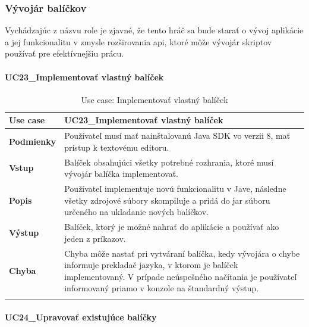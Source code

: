 {\subsubsection{Vývojár balíčkov}
\indent Vychádzajúc z názvu role je zjavné, že tento hráč sa bude starať o vývoj aplikácie a jej funkcionalitu v zmysle rozširovania \acrshort{api}, ktoré môže vývojár skriptov používať pre efektívnejšiu prácu.
\paragraph{UC23\_Implementovať vlastný balíček}
\begin{center}
	\begin{longtable}{|p{2.5cm}|p{12.2cm}|}
		
			\hline
			\textbf{Use case} & UC23\_Implementovať vlastný balíček \\ 
			\hline
			\textbf{Podmienky} & Používateľ musí mať nainštalovanú Java SDK vo verzii 8, mať prístup k textovému editoru.  \\ 
			\hline
			\textbf{Vstup} & Balíček obsahujúci všetky potrebné rozhrania, ktoré musí vývojár balíčka implementovať.\\
			\hline
			\textbf{Popis} & Používateľ implementuje novú funkcionalitu v Jave, následne všetky zdrojové súbory skompiluje a pridá do \acrshort{jar} súboru určeného na ukladanie nových balíčkov.\\ 
			\hline
			\textbf{Výstup} & Balíček, ktorý je možné nahrať do aplikácie a používať ako jeden z príkazov.\\
			\hline
			\textbf{Chyba} & Chyba môže nastať pri vytváraní balíčka, kedy vývojára o chybe informuje prekladač jazyka, v ktorom je balíček implementovaný. V prípade neúspešného načítania je používateľ informovaný priamo v konzole na štandardný výstup.\\
			\hline
		\caption{Use case: Implementovať vlastný balíček}
		\label{table:1}
		
	\end{longtable}
\end{center}

\paragraph{UC24\_Upravovať existujúce balíčky}
\begin{center}
	\begin{longtable}{|p{2.5cm}|p{12.2cm}|}
		

\end{longtable}
\end{center}}
